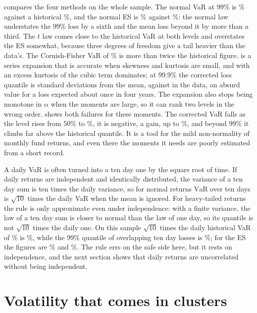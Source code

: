 \begin{chapterrefs}
 compares the four methods on the whole sample. The normal VaR at 99\% is \vrNorN\%
against a historical \vrHsN\%, and the normal ES is \esNorN\% against \esHsN\%: the normal law
understates the 99\% loss by a sixth and the mean loss beyond it by more than a third. The $t$ law
comes close to the historical VaR at both levels and overstates the ES somewhat, because three degrees of
freedom give a tail heavier than the data's. The Cornish-Fisher VaR of \vrCfN\% is more than twice the
historical figure.  is a series expansion that is accurate when skewness and kurtosis are
small, and with an excess kurtosis of \tdKurt{} the cubic term dominates; at 99.9\% the corrected
loss quantile is \cfLossNine{} standard deviations from the mean, against \cfHsThree{} in the data, an
absurd value for a loss expected about once in four years. The expansion also stops being monotone
in $\alpha$ when the moments are large, so it can rank two levels in the wrong order.
 shows both failures for these moments. The corrected VaR falls as the level rises
from 50\% to \cfDownHi\%, it is negative, a gain, up to \cfNegHi\%, and beyond 99\% it climbs far above
the historical quantile. It is a tool for
the mild non-normality of monthly fund returns, and even there the moments it needs are poorly
estimated from a short record.

A daily VaR is often turned into a ten day one by the square root of time. If daily returns are
independent and identically distributed, the variance of a ten day sum is ten times the daily
variance, so for normal returns $\mathrm{VaR}$ over ten days is $\sqrt{10}$ times the daily VaR when the
mean is ignored. For heavy-tailed returns the rule is only approximate even under independence: with a
finite variance, the law of a ten day sum is closer to normal than the law of one day, so its quantile
is not $\sqrt{10}$ times the daily one. On this sample $\sqrt{10}$ times the daily
historical VaR of \srOne\% is \srScaled\%, while the 99\% quantile of overlapping ten day losses is
\srTen\%; for the ES the figures are \srScaledEs\% and \srTenEs\%. The rule errs on the safe side
here, but it rests on independence, and the next section shows that daily returns are uncorrelated
without being independent.

\FloatBarrier
\section{Volatility that comes in clusters}
\label{sec8:garch}


\end{chapterrefs}
